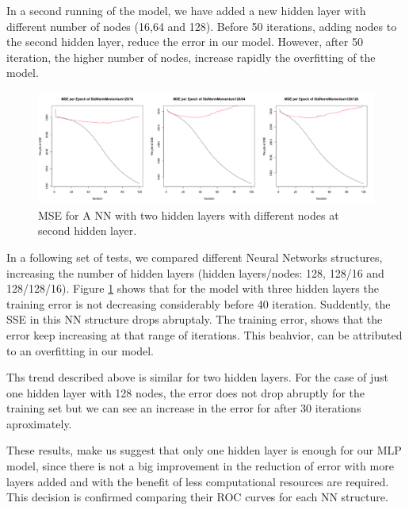 \documentclass[11.5pt]{article}
\newcounter{Figure}
\newcounter{graphics}
\begin{document}
In a second running of the model, we have added a new hidden layer  with different number of nodes (16,64 and 128). Before 50 iterations, adding nodes to the second hidden layer, reduce the error in our model. However, after 50 iteration, the higher number of nodes, increase rapidly the overfitting  of the model. \par 


\begin{figure}[h!]
\includegraphics[width=1\textwidth]{report_mlp/128-16_64_128.png}
  \caption{\small MSE for A NN with two hidden layers with different nodes at second hidden layer.}
\label{128-16_64_128.png}
\end{figure}

In  a following set of tests, we compared different Neural Networks structures, increasing the number of hidden layers (hidden layers/nodes: 128, 128/16 and 128/128/16).  Figure \ref{128-16_64_128.png} shows that for the model with three hidden layers the training error is not decreasing considerably before 40 iteration. Suddently, the SSE in this NN structure drops abruptaly. The training error, shows that the error keep increasing at that range of iterations. This beahvior, can be attributed to an overfitting in our model. \par

Ths trend described above is similar for two hidden layers. For the case of just one hidden layer with 128 nodes, the error does not drop abruptly for the training set but we can see an increase in the error for after 30 iterations aproximately. \par 

These results, make us suggest that only one hidden layer is enough for our MLP model, since there is not a big improvement in the reduction of error with more layers added and with the benefit of less computational resources are required.
This decision is confirmed comparing their ROC curves for each NN structure.
 
\end{document}
